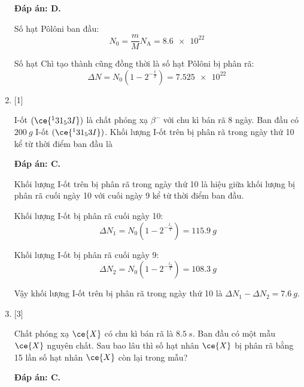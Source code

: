 \begin{enumerate}[label=\bfseries Câu \arabic*:]
	\loigiai
	{		\textbf{Đáp án: D.}
		
		Số hạt Pôlôni ban đầu:
		$$N_0 = \dfrac{m}{M} N_\text{A} = \SI{8.6e22}{}$$
		
		Số hạt Chì tạo thành cũng đồng thời là số hạt Pôlôni bị phân rã:
		$$\Delta N=N_0 (1-2 ^{-\frac{t}{T}} )= \SI{7.525e22}{}$$
		
	}
	
	\item {} [1]
	\cauhoi
	{I-ốt $(\ce{^131_53 I})$ là chất phóng xạ $\beta^-$ với chu kì bán rã 8 ngày. Ban đầu có $\SI{200}{g}$ I-ốt $(\ce{^131_53 I})$. Khối lượng I-ốt trên bị phân rã trong ngày thứ 10 kể từ thời điểm ban đầu là
	}
	
	\loigiai
	{		\textbf{Đáp án: C.}
		
		Khối lượng I-ốt trên bị phân rã trong ngày thứ 10 là hiệu giữa khối lượng bị phân rã cuối ngày 10 với cuối ngày 9 kể từ thời điểm ban đầu.
		
		Khối lượng I-ốt bị phân rã cuối ngày 10:
		$$\Delta N_1 = N_0 (1-2^{-\frac{t_1}{T}}) = \SI{115.9}{g}$$
		
		Khối lượng I-ốt bị phân rã cuối ngày 9:
		$$\Delta N_2 = N_0 (1-2^{-\frac{t_2}{T}}) = \SI{108.3}{g}$$
		
		Vậy khối lượng I-ốt trên bị phân rã trong ngày thứ 10 là $\Delta N_1 - \Delta N_2 = \SI{7.6}{g}$.
		
	}
	
	\item {} [3]
	\cauhoi
	{Chất phóng xạ $\ce{X}$ có chu kì bán rã là $\SI{8.5}{s}$. Ban đầu có một mẫu $\ce{X}$ nguyên chất. Sau bao lâu thì số hạt nhân $\ce{X}$ bị phân rã bằng 15 lần số hạt nhân $\ce{X}$ còn lại trong mẫu?
	}
	
	\loigiai
	{		\textbf{Đáp án: C.}
		
}
\end{enumerate}
